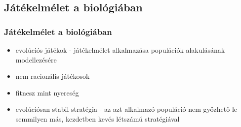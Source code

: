\subsection{Játékelmélet a biológiában}
\begin{frame}
\frametitle{Játékelmélet a biológiában}
\begin{itemize}
	\item evolúciós játékok - játékelmélet alkalmazása populációk alakulásának modellezésére
	\item nem racionális játékosok
	\item fitnesz mint nyereség
	\item evolúciósan stabil stratégia - az azt alkalmazó populáció nem győzhető le semmilyen más, kezdetben kevés létszámú stratégiával
\end{itemize}
\end{frame}
